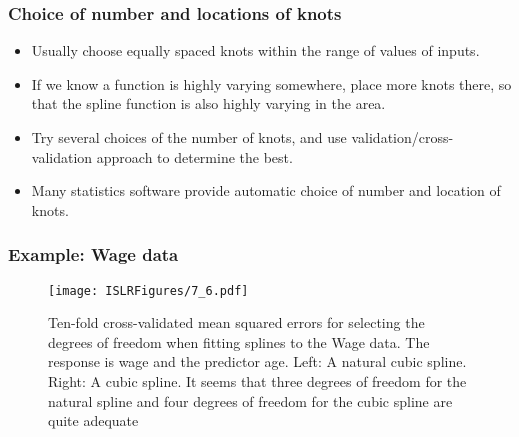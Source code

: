 \documentclass{beamer}
\begin{document}
                    
                    \begin{frame}
                    	\frametitle{Choice of number and locations of knots  }
                    	\begin{itemize}
                    		\item Usually choose equally spaced knots within the range of values of inputs.
                    		\item If we know a function is highly varying somewhere, place more knots there, so that
                    		the spline function is also highly varying in the area.
                    		\item Try several choices of the number of knots, and use validation/cross-validation approach to determine the best.
                    		\item Many statistics software provide automatic choice of number and location of knots.
                    		
                    	\end{itemize}
                    \end{frame} 
                 
                   
                   
                     \begin{frame}
                     	\frametitle{Example: Wage data}
                     	\begin{figure}
                     		\centering
                     		
                     		\centering
                     		\texttt{[image: ISLRFigures/7\_6.pdf]}
                     		\caption{Ten-fold cross-validated mean squared errors for selecting the
                     			degrees of freedom when fitting splines to the Wage data. The response is wage
                     			and the predictor age. Left: A natural cubic spline. Right: A cubic spline.
                     			It seems that three degrees of freedom for the natural
                     			spline and four degrees of freedom for the cubic spline are quite adequate
                     		}
                     	\end{figure}
                     \end{frame}
                     
                     
                     
\end{document}

